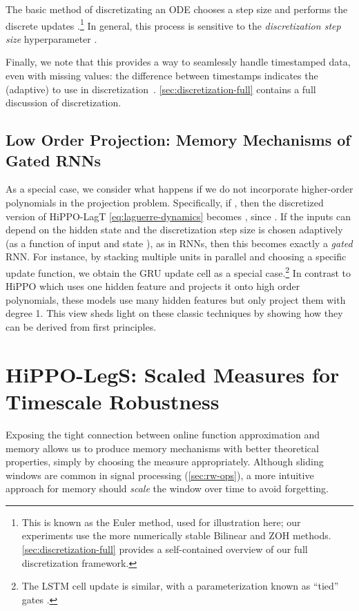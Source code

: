 \documentclass{article}
\begin{document}
The basic method of discretizating an ODE  chooses a step size  and performs the discrete updates
.\footnote{This is known as the Euler method, used for illustration here; our experiments use the more numerically stable Bilinear and ZOH methods.
\cref{sec:discretization-full} provides a self-contained overview of our full discretization framework.}
In general, this process is sensitive to the \emph{discretization step size} hyperparameter .

Finally, we note that this provides a way to seamlessly handle timestamped data, even with missing values:
the difference between timestamps indicates the (adaptive)  to use in discretization~\citep{chen2018neural}.
\cref{sec:discretization-full} contains a full discussion of discretization.




\subsection{Low Order Projection: Memory Mechanisms of Gated RNNs}
\label{subsec:low_order_projection}

As a special case, we consider what happens if we do not incorporate higher-order polynomials in the projection problem.
Specifically, if , then the discretized version of HiPPO-LagT \eqref{eq:laguerre-dynamics} becomes
, since .
If the inputs  can depend on the hidden state  and the discretization step size  is chosen adaptively (as a function of input  and state ),
as in RNNs, then this becomes exactly a \emph{gated} RNN.
For instance, by stacking multiple units in parallel and choosing a specific update function,
we obtain the GRU update cell as a special case.\footnote{The LSTM cell update is similar, with a parameterization known as ``tied'' gates \cite{greff2016lstm}.}
In contrast to HiPPO which uses one hidden feature and projects it onto high order polynomials,
these models use many hidden features but only project them with degree 1.
This view sheds light on these classic techniques by showing how they can be derived from first principles.



 

\section{HiPPO-LegS: Scaled Measures for Timescale Robustness}
\label{sec:theory_legs}

Exposing the tight connection between online function approximation and memory allows us to produce memory mechanisms with better theoretical properties, simply by choosing the measure appropriately.
Although sliding windows are common in signal processing (\cref{sec:rw-ops}), a more intuitive approach for memory should \emph{scale} the window over time to avoid forgetting.
\end{document}
